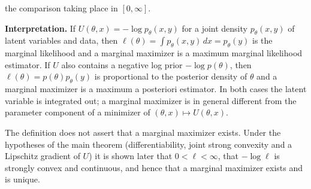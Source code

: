 \documentclass[11pt,a4paper]{report}
\begin{document}
the comparison taking place in \([0,\infty]\).




\textbf{Interpretation.} If \(U(\theta,x)=-\log p_\theta(x,y)\) for a joint density \(p_\theta(x,y)\) of latent variables and data, then \(\ell(\theta)=\int p_\theta(x,y)\,dx=p_\theta(y)\) is the marginal likelihood and a marginal maximizer is a maximum marginal likelihood estimator. If \(U\) also contains a negative log prior \(-\log p(\theta)\), then \(\ell(\theta)=p(\theta)p_\theta(y)\) is proportional to the posterior density of \(\theta\) and a marginal maximizer is a maximum a posteriori estimator. In both cases the latent variable is integrated out; a marginal maximizer is in general different from the parameter component of a minimizer of \((\theta,x)\mapsto U(\theta,x)\).




The definition does not assert that a marginal maximizer exists. Under the hypotheses of the main theorem (differentiability, joint strong convexity and a Lipschitz gradient of \(U\)) it is shown later that \(0<\ell<\infty\), that \(-\log\ell\) is strongly convex and continuous, and hence that a marginal maximizer exists and is unique.
\end{document}
